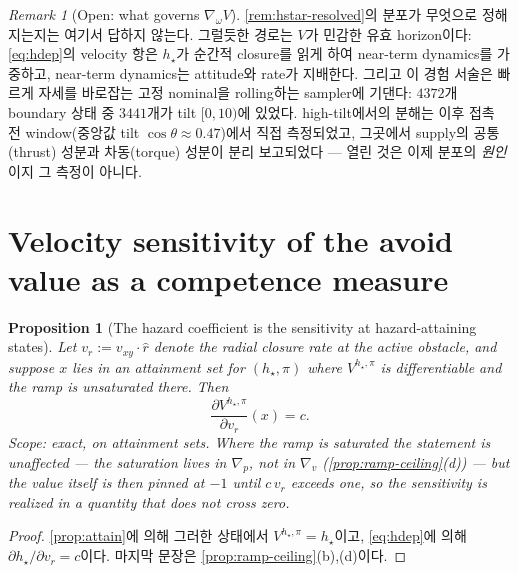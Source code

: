 \documentclass[11pt]{article}
\theoremstyle{plain}
\newtheorem{proposition}[theorem]{Proposition}
\theoremstyle{definition}
\theoremstyle{remark}
\newtheorem{remark}[theorem]{Remark}
\newcommand{\grad}{\nabla}
\newcommand{\eqdef}{:=}
\begin{document}
\begin{remark}[Open: what governs $\grad_\omega V$]\label{rem:omega-open}
\cref{rem:hstar-resolved}의 분포가 무엇으로 정해지는지는 여기서 답하지 않는다. 그럴듯한 경로는 $V$가
민감한 유효 horizon이다: \cref{eq:hdep}의 velocity 항은 $h_\star$가 순간적 closure를 읽게 하여
near-term dynamics를 가중하고, near-term dynamics는 attitude와 rate가 지배한다. 그리고 이 경험
서술은 빠르게 자세를 바로잡는 고정 nominal을 rolling하는 sampler에 기댄다: $4372$개 boundary 상태
중 $3441$개가 tilt $[0,10)$에 있었다. high-tilt에서의 분해는 이후 접촉 전 window(중앙값
tilt $\cos\theta\approx0.47$)에서 직접 측정되었고, 그곳에서 supply의 공통(thrust) 성분과
차동(torque) 성분이 분리 보고되었다 --- 열린 것은 이제 분포의 \emph{원인}이지 그 측정이 아니다.
\end{remark}

\section{Velocity sensitivity of the avoid value as a competence measure}\label{sec:sens}

\begin{proposition}[The hazard coefficient is the sensitivity at hazard-attaining states]\label{prop:sens-c}
Let $v_r\eqdef v_{xy}\cdot\hat r$ denote the radial closure rate at the active obstacle, and
suppose $x$ lies in an attainment set for $(h_\star,\pi)$ where $V^{h_\star,\pi}$ is
differentiable and the ramp is unsaturated there. Then
\begin{equation}
\frac{\partial V^{h_\star,\pi}}{\partial v_r}(x)=c .
\end{equation}
Scope: exact, on attainment sets. Where the ramp is saturated the statement is unaffected --- the
saturation lives in $\grad_p$, not in $\grad_v$ (\cref{prop:ramp-ceiling}(d)) --- but the value
itself is then pinned at $-1$ until $c\,v_r$ exceeds one, so the sensitivity is realized in a
quantity that does not cross zero.
\end{proposition}
\begin{proof}
\cref{prop:attain}에 의해 그러한 상태에서 $V^{h_\star,\pi}=h_\star$이고, \cref{eq:hdep}에 의해
$\partial h_\star/\partial v_r=c$이다. 마지막 문장은 \cref{prop:ramp-ceiling}(b),(d)이다.
\end{proof}
\end{document}

